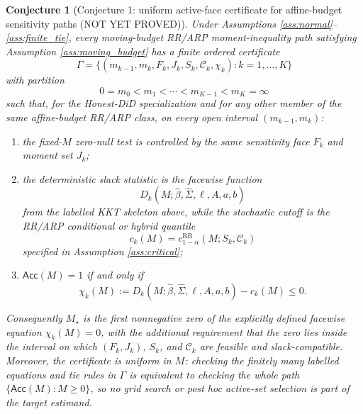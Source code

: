 \documentclass[11pt]{article}
\theoremstyle{definition}
\theoremstyle{plain}
\newtheorem{conjecture}{Conjecture}
\theoremstyle{remark}
\begin{document}
\begin{conjecture}[Conjecture 1: uniform active-face certificate for
affine-budget sensitivity paths (NOT YET PROVED)]\label{conj:phase_diagram}
Under Assumptions \ref{ass:normal}--\ref{ass:finite_tie}, every
moving-budget RR/ARP moment-inequality path satisfying Assumption
\ref{ass:moving_budget} has a finite ordered certificate
\[
\Gamma=\{(m_{k-1},m_k,F_k,J_k,S_k,\mathcal{C}_k,\chi_k):k=1,\ldots,K\}
\]
with partition
\[
0=m_0<m_1<\cdots<m_{K-1}<m_K=\infty
\]
such that, for the Honest-DiD specialization and for any other member of the
same affine-budget RR/ARP class, on every open interval
\((m_{k-1},m_k)\):
\begin{enumerate}[label=(\roman*)]
\item the fixed-\(M\) zero-null test is controlled by the same sensitivity
face \(F_k\) and moment set \(J_k\);
\item the deterministic slack statistic is the facewise function
\[
D_k(M;\widehat\beta,\widehat\Sigma,\ell,A,a,b)
\]
from the labelled KKT skeleton above, while the stochastic cutoff is the
RR/ARP conditional or hybrid quantile
\[
c_k(M)=c_{1-\alpha}^{\mathrm{RR}}(M;S_k,\mathcal{C}_k)
\]
specified in Assumption \ref{ass:critical};
\item \(\mathsf{Acc}(M)=1\) if and only if
\[
\chi_k(M):=
D_k(M;\widehat\beta,\widehat\Sigma,\ell,A,a,b)-c_k(M)\le 0.
\]
\end{enumerate}
Consequently \(M_\star\) is the first nonnegative zero of the explicitly
defined facewise equation \(\chi_k(M)=0\), with the additional requirement
that the zero lies inside the interval on which \((F_k,J_k)\), \(S_k\), and
\(\mathcal{C}_k\) are feasible and slack-compatible.  Moreover, the certificate
is uniform in \(M\): checking the finitely many labelled equations and tie
rules in \(\Gamma\) is equivalent to checking the whole path
\(\{\mathsf{Acc}(M):M\ge 0\}\), so no grid search or post hoc active-set
selection is part of the target estimand.
\end{conjecture}
\end{document}
